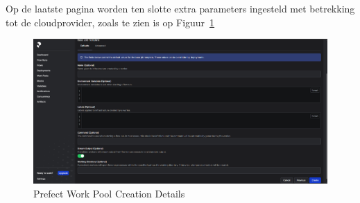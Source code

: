 Op de laatste pagina worden ten slotte extra parameters ingesteld met betrekking tot de cloudprovider, zoals te zien is op Figuur~\ref{fig:Prefect_Work_Pools_Create_parameters}

\begin{figure}
    \centering
    \includegraphics[width=0.9\linewidth]{graphics/Prefect_Work_Pools_Create_Parameters.PNG}
    \caption{Prefect Work Pool Creation Details}
    \label{fig:Prefect_Work_Pools_Create_parameters}
\end{figure}